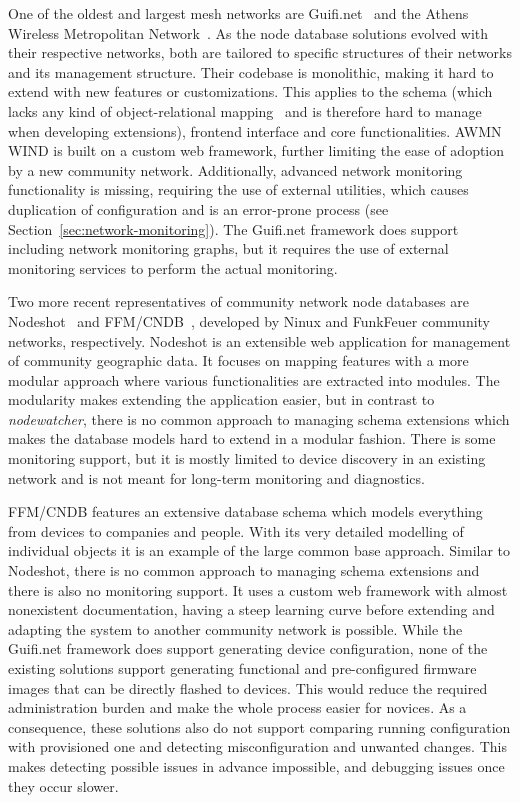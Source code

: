 \documentclass[5p,sort&compress]{elsarticle}
\newcommand{\nodewatcher}{\textit{nodewatcher}}
\begin{document}
One of the oldest and largest mesh networks are Guifi.net~\cite{Guifinode_2003,Vega_2012} and the Athens Wireless Metropolitan Network~\cite{AWMN_WIND_2002}.
As the node database solutions evolved with their respective networks, both are tailored to specific structures of their networks and its management structure.
Their codebase is monolithic, making it hard to extend with new features or customizations.
This applies to the schema (which lacks any kind of object-relational mapping~\cite{ONeil_2008} and is therefore hard to manage when developing extensions), frontend interface and core functionalities.
AWMN WIND is built on a custom web framework, further limiting the ease of adoption by a new community network.
Additionally, advanced network monitoring functionality is missing, requiring the use of external utilities, which causes duplication of configuration and is an error-prone process (see Section~\ref{sec:network-monitoring}).
The Guifi.net framework does support including network monitoring graphs, but it requires the use of external monitoring services to perform the actual monitoring.

Two more recent representatives of community network node databases are Nodeshot~\cite{Nodeshot_2012} and FFM/CNDB~\cite{Funkfeuer_2012}, developed by Ninux and FunkFeuer community networks, respectively.
Nodeshot is an extensible web application for management of community geographic data.
It focuses on mapping features with a more modular approach where various functionalities are extracted into modules.
The modularity makes extending the application easier, but in contrast to \nodewatcher{}, there is no common approach to managing schema extensions which makes the database models hard to extend in a modular fashion.
There is some monitoring support, but it is mostly limited to device discovery in an existing network and is not meant for long-term monitoring and diagnostics.

FFM/CNDB features an extensive database schema which models everything from devices to companies and people.
With its very detailed modelling of individual objects it is an example of the large common base approach.
Similar to Nodeshot, there is no common approach to managing schema extensions and there is also no monitoring support.
It uses a custom web framework with almost nonexistent documentation, having a steep learning curve before extending and adapting the system to another community network is possible.
While the Guifi.net framework does support generating device configuration, none of the existing solutions support generating functional and pre-configured firmware images that can be directly flashed to devices.
This would reduce the required administration burden and make the whole process easier for novices.
As a consequence, these solutions also do not support comparing running configuration with provisioned one and detecting misconfiguration and unwanted changes.
This makes detecting possible issues in advance impossible, and debugging issues once they occur slower.
\end{document}
